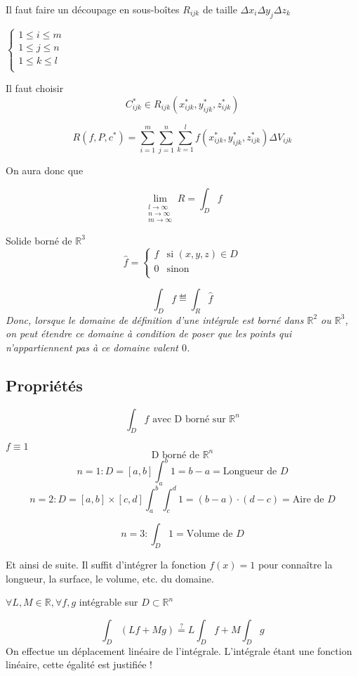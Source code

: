 Il faut faire un découpage en sous-boîtes $ R_{ijk} $ de taille $\Delta x_i \Delta y_j \Delta z_k$

$\left\{
\begin{array}{l}
1 \le i \le m \\
1 \le j \le n \\
1 \le k \le l \\
\end{array}
\right. $

Il faut choisir \[C_{ijk}^* \in R_{ijk} ( x_{ijk}^*,y_{ijk}^*,z_{ijk}^*)\]

\[R(f,P,c^*)=\sum_{i=1}^m \sum_{j=1}^n\sum_{k=1}^l f (x_{ijk}^*,y_{ijk}^*,z_{ijk}^*) \Delta V_{ijk}\]

On aura donc que

$$\lim\limits_{\substack{l \to \infty \\ n \to \infty\\ m \to \infty}} R=\int_D f$$

Solide borné de $\mathbb{R}^3$
\[\hat{f}=
\begin{cases}
f & \text{si } (x, y, z) \in D \\
0 & \text{sinon} \\
\end{cases}
\]

\[\int_D f \eqdef \int_R \hat{f}\]
\emph{
Donc, lorsque le domaine de définition d'une intégrale est borné dans $\mathbb{R}^2$ ou $\mathbb{R}^3$, on peut étendre ce domaine à condition de poser que les points qui n'appartiennent pas à ce domaine valent $0$.}
\subsection{Propriétés}

\[\int_D f \text{ avec D borné sur } \mathbb{R}^n\]

\begin{myprop}
$f\equiv 1 $
\[\text{D borné de }\mathbb{R}^n\]
\[n=1 : D=[a,b] \int_a^b 1 = b-a = \text{Longueur de }D\]
\[n=2 : D=[a,b]\times[c,d] \int_a^b \int_c^d 1 = (b-a) \cdot (d-c)= \text{Aire de }D\]

\[n=3 : \int_D 1 = \text{Volume de }D\]

Et ainsi de suite. Il suffit d'intégrer la fonction $f(x) = 1$ pour connaître la longueur, la surface, le volume, etc. du domaine.
\end{myprop}


\begin{myprop}
$\forall L,M \in \mathbb{R} ,\forall f,g$ intégrable sur $D \subset \mathbb{R}^n$


\[\int_D(Lf+Mg)\overset{?}{=}L\int_D f + M \int_D g\]
On effectue un déplacement linéaire de l'intégrale. L'intégrale étant une fonction linéaire, cette égalité est justifiée !

\end{myprop}


